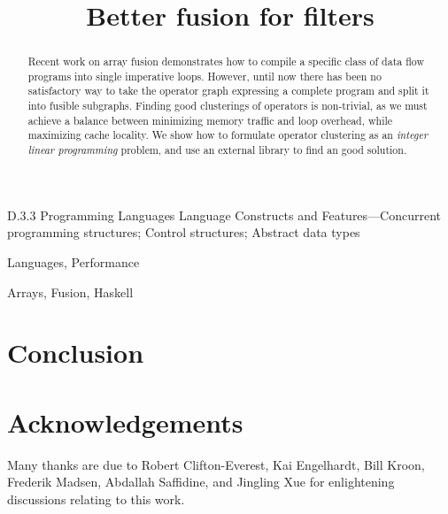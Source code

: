 \documentclass[preprint]{sigplanconf}
\begin{document}
\title{Better fusion for filters}


\maketitle
\makeatactive

\begin{abstract}
Recent work on array fusion demonstrates how to compile a specific class of data flow programs into single imperative loops. However, until now there has been no satisfactory way to take the operator graph expressing a complete program and split it into fusible subgraphs. Finding good clusterings of operators is non-trivial, as we must achieve a balance between minimizing memory traffic and loop overhead, while maximizing cache locality. We show how to formulate operator clustering as an \emph{integer linear programming} problem, and use an external library to find an good solution. 
\end{abstract}



\category
	{D.3.3}
	{Programming Languages}
	{Language Constructs and Features---Concurrent programming structures; Control structures; Abstract data types}

\terms
	Languages, Performance

\keywords
	Arrays, Fusion, Haskell







\section{Conclusion}

\section*{Acknowledgements}
Many thanks are due to
Robert Clifton-Everest,
Kai Engelhardt,
Bill Kroon,
Frederik Madsen,
Abdallah Saffidine,
and Jingling Xue
for enlightening discussions relating to this work.



\end{document}
